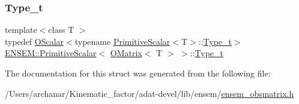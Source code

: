 \subsubsection{\texorpdfstring{Type\_t}{Type\_t}\hspace{0.1cm}{\footnotesize\ttfamily [3/3]}}
{\footnotesize\ttfamily template$<$class T $>$ \\
typedef \mbox{\hyperlink{classENSEM_1_1OScalar}{O\+Scalar}}$<$typename \mbox{\hyperlink{structENSEM_1_1PrimitiveScalar}{Primitive\+Scalar}}$<$T$>$\+::\mbox{\hyperlink{structENSEM_1_1PrimitiveScalar_3_01OMatrix_3_01T_01_4_01_4_a4e7f325878a1ec4acea1a745cbd24af6}{Type\+\_\+t}}$>$ \mbox{\hyperlink{structENSEM_1_1PrimitiveScalar}{E\+N\+S\+E\+M\+::\+Primitive\+Scalar}}$<$ \mbox{\hyperlink{classENSEM_1_1OMatrix}{O\+Matrix}}$<$ T $>$ $>$\+::\mbox{\hyperlink{structENSEM_1_1PrimitiveScalar_3_01OMatrix_3_01T_01_4_01_4_a4e7f325878a1ec4acea1a745cbd24af6}{Type\+\_\+t}}}



The documentation for this struct was generated from the following file\+:\begin{DoxyCompactItemize}
\item 
/\+Users/archanar/\+Kinematic\+\_\+factor/adat-\/devel/lib/ensem/\mbox{\hyperlink{adat-devel_2lib_2ensem_2ensem__obsmatrix_8h}{ensem\+\_\+obsmatrix.\+h}}\end{DoxyCompactItemize}
